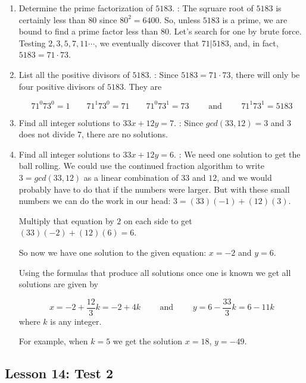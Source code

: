 \documentclass[11pt]{amsart}
\begin{document}
\begin{enumerate}


\item Determine the prime factorization of $5183$.
\medskip
{}: The sqruare root of $5183$ is certainly
less than $80$ since $80^2 = 6400$. So, unless $5183$ is a prime, 
we are bound to find a prime factor less than $80$. Let's search 
for one by brute force. Testing $2,3,5,7,11\cdots$, we eventually
discover that $71|5183$, and, in fact, $5183 = 71\cdot73$. 


\medskip

\item List all the positive divisors of $5183$.
\medskip
{}: Since $5183 = 71\cdot73$, there will only
be four positive divisors of $5183$. They are

\[
71^0 73^0 = 1\qquad 71^1 73^0= 71\qquad 71^0 73^1 = 73\qquad \text{ and }\qquad 71^1 73^1 = 5183
\]
 
\medskip

\item Find all integer solutions to $33x+12y =7$.
\medskip
{}: Since $gcd(33,12)=3$ and $3$ does not divide $7$, there are no solutions.

\medskip

\item Find all integer solutions to $33x+12y =6$.
\medskip
{}: We need one solution to get the ball rolling.
We could use the continued fraction algorithm to write $3 = gcd(33,12)$
as a linear combination of $33$ and $12$, and we would probably have to
do that if the numbers were larger. But with these small numbers we can
do the work in our head: $3 = (33)(-1) + (12)(3)$.

Multiply that equation by $2$ on each side to get $(33)(-2)+ (12)(6) = 6$.

So now we have one solution to the given equation: $x = -2$ and $y=6$.

Using the formulas that produce all solutions once one is known we get all solutions
are given by

\[
 x = -2 + \frac{12}{3}k =-2+4k\qquad \text{ and }\qquad y = 6 - \frac{33}{3}k=6-11k
 \]
where $k$ is any integer.

For example, when $k=5$ we get the solution $x = 18$, $y = -49$.

\end{enumerate}

\subsection{Lesson 14: Test 2}
\end{document}
